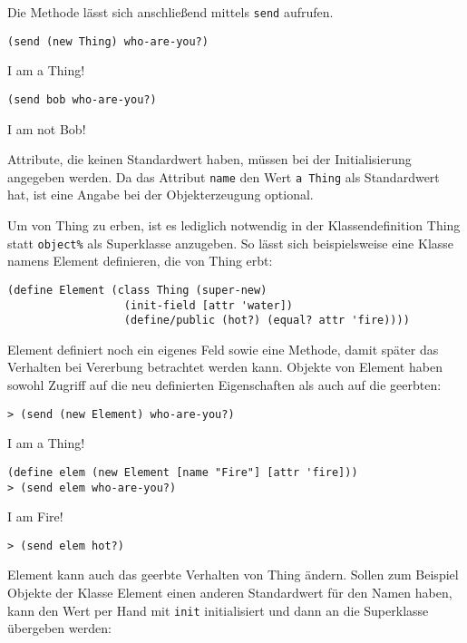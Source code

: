 Die Methode lässt sich anschließend mittels \texttt{send} aufrufen.

\begin{lstlisting}
(send (new Thing) who-are-you?)
\end{lstlisting}
{\routput {\qq}I am a Thing!{\qq}}

\begin{lstlisting}
(send bob who-are-you?)
\end{lstlisting}
{\routput {\qq}I am not Bob!{\qq}}

Attribute, die keinen Standardwert haben, müssen bei der Initialisierung angegeben werden. Da das Attribut \texttt{name} den Wert  \texttt{{\qq}a Thing{\qq}} als Standardwert hat, ist eine Angabe bei der Objekterzeugung optional. 

Um von Thing zu erben, ist es lediglich notwendig in der Klassendefinition Thing statt \texttt{object\%} als Superklasse anzugeben. So lässt sich beispielsweise eine Klasse namens Element definieren, die von Thing erbt:

\begin{lstlisting}
(define Element (class Thing (super-new)
                  (init-field [attr 'water])
                  (define/public (hot?) (equal? attr 'fire))))
\end{lstlisting}

Element definiert noch ein eigenes Feld sowie eine Methode, damit später das Verhalten bei Vererbung betrachtet werden kann. Objekte von Element haben sowohl Zugriff auf die neu definierten Eigenschaften als auch auf die geerbten:

\begin{lstlisting}
> (send (new Element) who-are-you?)
\end{lstlisting}
{\routput {\qq}I am a Thing!\qq}

\begin{lstlisting}
(define elem (new Element [name "Fire"] [attr 'fire]))
> (send elem who-are-you?)
\end{lstlisting} 
{\routput {\qq}I am Fire!\qq}
\begin{lstlisting}
> (send elem hot?)
\end{lstlisting} 
{}

Element kann auch das geerbte Verhalten von Thing ändern. Sollen zum Beispiel Objekte der Klasse Element einen anderen Standardwert für den Namen haben, kann den Wert per Hand mit \texttt{init} initialisiert und dann an die Superklasse übergeben werden:

